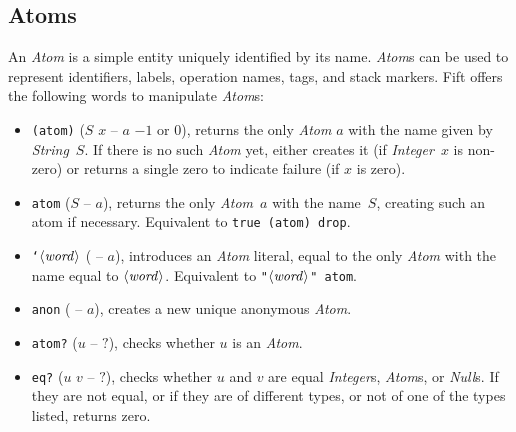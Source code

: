 \documentclass[12pt,oneside]{article}
\def\mysubsection#1{\subsection{#1}\fancyhead[C]{\small{\textsc{\textrm{\thesubsection.} #1}}}}
\begin{document}
\mysubsection{Atoms}\label{p:atoms}
An {\em Atom\/} is a simple entity uniquely identified by its name. {\em Atom\/}s can be used to represent identifiers, labels, operation names, tags, and stack markers. Fift offers the following words to manipulate {\em Atom\/}s:
\begin{itemize}
\item {\tt (atom)} ($S$ $x$ -- $a$ $-1$ or $0$), returns the only {\em Atom\/} $a$ with the name given by {\em String\/}~$S$. If there is no such {\em Atom\/} yet, either creates it (if {\em Integer\/}~$x$ is non-zero) or returns a single zero to indicate failure (if $x$ is zero).
\item {\tt atom} ($S$ -- $a$), returns the only {\em Atom\/}~$a$ with the name~$S$, creating such an atom if necessary. Equivalent to {\tt true (atom) drop}.
\item {\tt `$\langle\textit{word\/}\rangle$} ( -- $a$), introduces an {\em Atom\/} literal, equal to the only {\em Atom\/} with the name equal to $\langle\textit{word\/}\rangle$. Equivalent to {\tt "$\langle\textit{word\/}\rangle$" atom}.
\item {\tt anon} ( -- $a$), creates a new unique anonymous {\em Atom}.
\item {\tt atom?} ($u$ -- $?$), checks whether $u$ is an {\em Atom}.
\item {\tt eq?} ($u$ $v$ -- $?$), checks whether $u$ and $v$ are equal {\em Integer\/}s, {\em Atom\/}s, or {\em Null\/}s. If they are not equal, or if they are of different types, or not of one of the types listed, returns zero.
\end{itemize}
\end{document}
